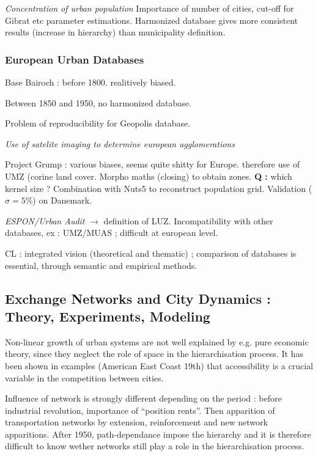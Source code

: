 \textit{Concentration of urban population} Importance of number of cities, cut-off for Gibrat etc parameter estimations. Harmonized database gives more consistent results (increase in hierarchy) than municipality definition.



\subsubsection{European Urban Databases}

Base Bairoch : before 1800. realitively biased.

Between 1850 and 1950, no harmonized database. 

Problem of reproducibility for Geopolis database.

\textit{Use of satelite imaging to determine european agglomerations}

Project Grump : various biases, seems quite shitty for Europe. therefore use of UMZ (corine land cover. Morpho maths (closing) to obtain zones. \textbf{Q : } which kernel size ? Combination with Nuts5 to reconstruct population grid. Validation ($\sigma = 5\%$) on Danemark.


\textit{ESPON/Urban Audit} $\rightarrow$ definition of LUZ. Incompatibility with other databases, ex : UMZ/MUAS ; difficult at european level.

CL : integrated vision (theoretical and thematic) ; comparison of databases is essential, through semantic and empirical methods.




\subsection{Exchange Networks and City Dynamics : Theory, Experiments, Modeling}

Non-linear growth of urban systems are not well explained by e.g. pure economic theory, since they neglect the role of space in the hierarchisation process. It has been shown in examples (American East Coast 19th) that accessibility is a crucial variable in the competition between cities.

Influence of network is strongly different depending on the period : before industrial revolution, importance of ``position rents''. Then apparition of transportation networks by extension, reinforcement and new network apparitions. After 1950, path-dependance impose the hierarchy and it is therefore difficult to know wether networks still play a role in the hierarchisation process.

